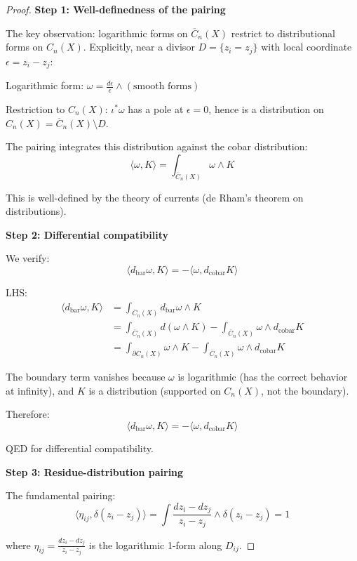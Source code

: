 \begin{proof}
\textbf{Step 1: Well-definedness of the pairing}

The key observation: logarithmic forms on $\overline{C}_n(X)$ restrict to distributional 
forms on $C_n(X)$. Explicitly, near a divisor $D = \{z_i = z_j\}$ with local 
coordinate $\epsilon = z_i - z_j$:

Logarithmic form: $\omega = \frac{d\epsilon}{\epsilon} \wedge (\text{smooth forms})$

Restriction to $C_n(X)$: $\iota^*\omega$ has a pole at $\epsilon = 0$, hence is 
a distribution on $C_n(X) = \overline{C}_n(X) \setminus D$.

The pairing integrates this distribution against the cobar distribution:
$$\langle \omega, K \rangle = \int_{\overline{C}_n(X)} \omega \wedge K$$

This is well-defined by the theory of currents (de Rham's theorem on distributions).

\textbf{Step 2: Differential compatibility}

We verify:
$$\langle d_{\text{bar}}\omega, K \rangle = -\langle \omega, d_{\text{cobar}}K \rangle$$

LHS:
\begin{align*}
\langle d_{\text{bar}}\omega, K \rangle &= \int_{\overline{C}_n(X)} d_{\text{bar}}\omega 
\wedge K \\
&= \int_{\overline{C}_n(X)} d(\omega \wedge K) - \int_{\overline{C}_n(X)} \omega 
\wedge d_{\text{cobar}}K \\
&= \int_{\partial \overline{C}_n(X)} \omega \wedge K - \int_{\overline{C}_n(X)} 
\omega \wedge d_{\text{cobar}}K
\end{align*}

The boundary term vanishes because $\omega$ is logarithmic (has the correct behavior 
at infinity), and $K$ is a distribution (supported on $C_n(X)$, not the boundary).

Therefore:
$$\langle d_{\text{bar}}\omega, K \rangle = -\langle \omega, d_{\text{cobar}}K \rangle$$

QED for differential compatibility.

\textbf{Step 3: Residue-distribution pairing}

The fundamental pairing:
$$\langle \eta_{ij}, \delta(z_i - z_j) \rangle = \int \frac{dz_i - dz_j}{z_i - z_j} 
\wedge \delta(z_i - z_j) = 1$$

where $\eta_{ij} = \frac{dz_i - dz_j}{z_i - z_j}$ is the logarithmic 1-form along 
$D_{ij}$.


\end{proof}
